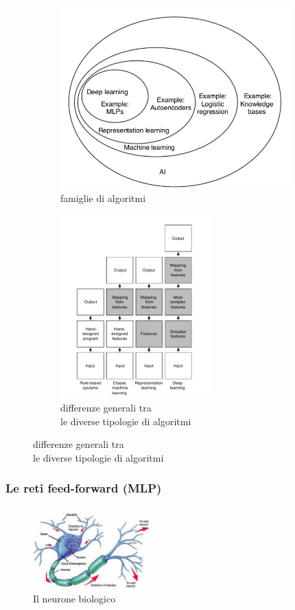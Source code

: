 \documentclass[10pt,a4paper]{article}
\begin{document}
\begin{figure}[h!]
  \centering
  \begin{subfigure}[t]{0.45\linewidth}
  	\centering
    \includegraphics[height=200pt]{AI_venn_diagram.png}
    \caption*{famiglie di algoritmi}
  \end{subfigure}
  \begin{subfigure}[t]{0.45\linewidth}
  	\centering
    \includegraphics[height=200pt]{diff_between_aprochs.png}
    \caption*{differenze generali tra \\ le diverse tipologie di algoritmi}
  \end{subfigure}
  \label{fig:graph1}
\end{figure}
\clearpage

\subsubsection{Le reti feed-forward (MLP)}

\begin{figure}
	\centering
	\vspace{-25pt}
    \includegraphics[width=0.4\textwidth]{neurone.jpg}
  	\caption{Il neurone biologico}
  	\label{fig:graph2}
  	\vspace{-20pt}
\end{figure}
\end{document}
